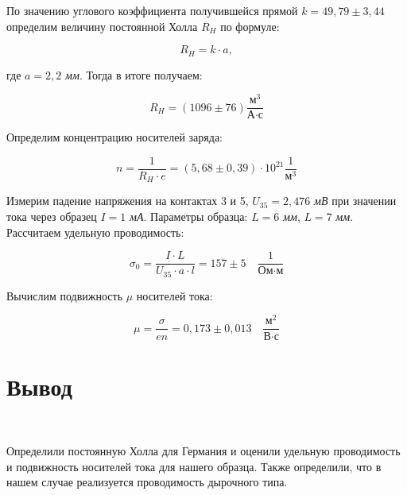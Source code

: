 \documentclass[11pt]{article}
\begin{document}
По значению углового коэффициента получившейся прямой $k = 49,79 \pm 3,44$  определим величину постоянной Холла $R_H$ по формуле:

\[R_H = k \cdot a,\]

где $a = 2,2$ \textit{мм}. Тогда в итоге получаем:

\[R_H = (1096 \pm 76) \frac{\textit{м}^3}{\textit{А}\cdot\textit{с}}\]

\vspace{0.5cm}

Определим концентрацию носителей заряда:

\[n = \frac{1}{R_H \cdot e} = (5,68 \pm 0,39) \cdot 10^{21} \frac{1}{\textit{м}^3}\]

\vspace{0.5cm}

Измерим падение напряжения на контактах 3 и 5, $U_{35} = 2,476$ \textit{мВ} при значении тока через образец $I = 1$ \textit{мА}. Параметры образца: $L = 6$ \textit{мм}, $L = 7$ \textit{мм}. Рассчитаем удельную проводимость:

\[\sigma_0 = \frac{I \cdot L}{U_{35} \cdot a \cdot l} = 157 \pm 5 \quad \frac{1}{\textit{Ом}\cdot\textit{м}}\]

Вычислим подвижность $\mu$ носителей тока:

\[\mu = \frac{\sigma}{en} = 0,173 \pm 0,013 \quad \frac{\textit{м}^2}{\textit{В}\cdot\textit{с}}\]

\section*{Вывод}\

Определили постоянную Холла для Германия и оценили удельную проводимость и подвижность носителей тока для нашего образца. Также определили, что в нашем случае реализуется проводимость дырочного типа.
\end{document}

